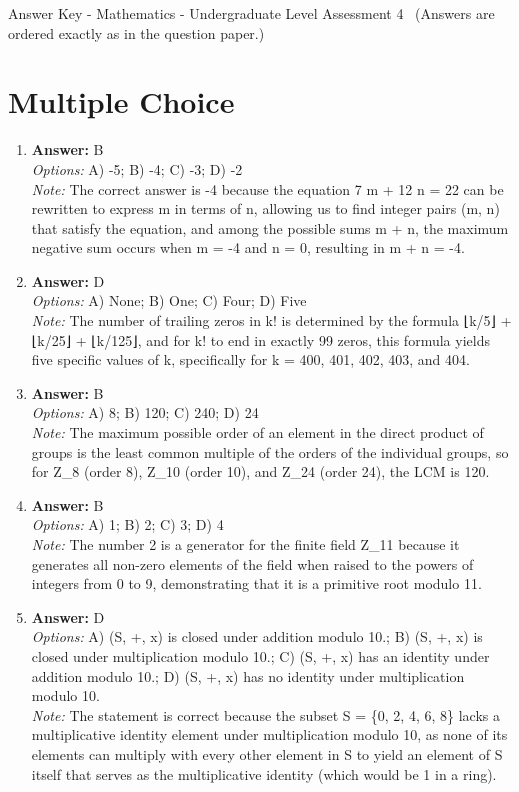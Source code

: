 \documentclass[12pt]{article}
\begin{document}
\begin{center}
Answer Key - Mathematics - Undergraduate Level Assessment 4 \
\small (Answers are ordered exactly as in the question paper.)
\end{center}

\section*{Multiple Choice}
\begin{enumerate}[label=\arabic*.]
\item \textbf{Answer:} B
\\ \textit{Options:} A) -5; B) -4; C) -3; D) -2
\\ \textit{Note:} The correct answer is -4 because the equation 7 m + 12 n = 22 can be rewritten to express m in terms of n, allowing us to find integer pairs (m, n) that satisfy the equation, and among the possible sums m + n, the maximum negative sum occurs when m = -4 and n = 0, resulting in m + n = -4.
\item \textbf{Answer:} D
\\ \textit{Options:} A) None; B) One; C) Four; D) Five
\\ \textit{Note:} The number of trailing zeros in k! is determined by the formula ⌊k/5⌋ + ⌊k/25⌋ + ⌊k/125⌋, and for k! to end in exactly 99 zeros, this formula yields five specific values of k, specifically for k = 400, 401, 402, 403, and 404.
\item \textbf{Answer:} B
\\ \textit{Options:} A) 8; B) 120; C) 240; D) 24
\\ \textit{Note:} The maximum possible order of an element in the direct product of groups is the least common multiple of the orders of the individual groups, so for Z\_8 (order 8), Z\_10 (order 10), and Z\_24 (order 24), the LCM is 120.
\item \textbf{Answer:} B
\\ \textit{Options:} A) 1; B) 2; C) 3; D) 4
\\ \textit{Note:} The number 2 is a generator for the finite field Z\_11 because it generates all non-zero elements of the field when raised to the powers of integers from 0 to 9, demonstrating that it is a primitive root modulo 11.
\item \textbf{Answer:} D
\\ \textit{Options:} A) (S, +, x) is closed under addition modulo 10.; B) (S, +, x) is closed under multiplication modulo 10.; C) (S, +, x) has an identity under addition modulo 10.; D) (S, +, x) has no identity under multiplication modulo 10.
\\ \textit{Note:} The statement is correct because the subset S = \{0, 2, 4, 6, 8\} lacks a multiplicative identity element under multiplication modulo 10, as none of its elements can multiply with every other element in S to yield an element of S itself that serves as the multiplicative identity (which would be 1 in a ring).
\end{enumerate}
\end{document}
